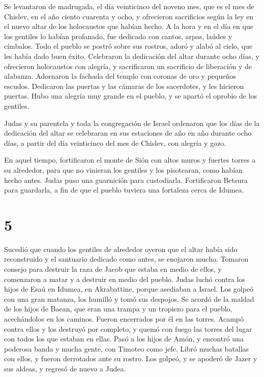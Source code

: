  Se levantaron de madrugada, el día veinticinco del
noveno mes, que es el mes de Chislev, en el año ciento cuarenta y ocho,
 y ofrecieron sacrificios según la ley en el nuevo altar
de los holocaustos que habían hecho.  A la hora y en el
día en que los gentiles lo habían profanado, fue dedicado con cantos,
arpas, laúdes y címbalos.  Todo el pueblo se postró sobre
sus rostros, adoró y alabó al cielo, que les había dado buen éxito.
 Celebraron la dedicación del altar durante ocho días, y
ofrecieron holocaustos con alegría, y sacrificaron un sacrificio de
liberación y de alabanza.  Adornaron la fachada del
templo con coronas de oro y pequeños escudos. Dedicaron las puertas y
las cámaras de los sacerdotes, y les hicieron puertas. 
Hubo una alegría muy grande en el pueblo, y se apartó el oprobio de los
gentiles.

 Judas y su parentela y toda la congregación de Israel
ordenaron que los días de la dedicación del altar se celebraran en sus
estaciones de año en año durante ocho días, a partir del día veinticinco
del mes de Chislev, con alegría y gozo.

 En aquel tiempo, fortificaron el monte de Sión con altos
muros y fuertes torres a su alrededor, para que no vinieran los gentiles
y los pisotearan, como habían hecho antes.  Judas puso
una guarnición para custodiarla. Fortificaron Betsura para guardarla, a
fin de que el pueblo tuviera una fortaleza cerca de Idumea.

\hypertarget{section-4}{%
\section{5}\label{section-4}}

 Sucedió que cuando los gentiles de alrededor oyeron que
el altar había sido reconstruido y el santuario dedicado como antes, se
enojaron mucho.  Tomaron consejo para destruir la raza de
Jacob que estaba en medio de ellos, y comenzaron a matar y a destruir en
medio del pueblo.  Judas luchó contra los hijos de Esaú en
Idumea, en Akrabattine, porque asediaban a Israel. Los golpeó con una
gran matanza, los humilló y tomó sus despojos.  Se acordó
de la maldad de los hijos de Baean, que eran una trampa y un tropiezo
para el pueblo, acechándolos en los caminos.  Fueron
encerrados por él en las torres. Acampó contra ellos y los destruyó por
completo, y quemó con fuego las torres del lugar con todos los que
estaban en ellas.  Pasó a los hijos de Amón, y encontró
una poderosa banda y mucha gente, con Timoteo como jefe. 
Libró muchas batallas con ellos, y fueron derrotados ante su rostro. Los
golpeó,  y se apoderó de Jazer y sus aldeas, y regresó de
nuevo a Judea.

